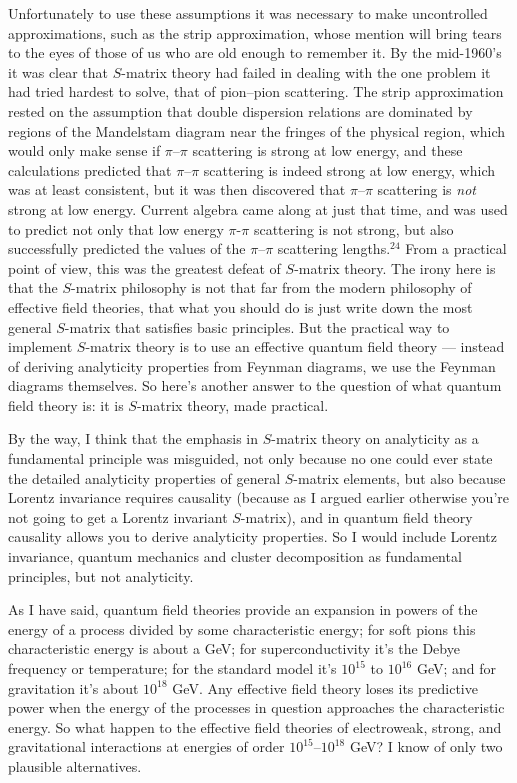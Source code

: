 \documentclass[12pt]{article}
\begin{document}
Unfortunately to use these assumptions it was necessary to
make uncontrolled approximations, such as the strip
approximation, whose mention will bring tears to the eyes of
those of us who are old enough to remember it.  By the
mid-1960's it was clear that $S$-matrix theory had failed in
dealing with the one problem it had tried hardest to solve,
that of pion--pion scattering.  The strip approximation
rested on the assumption that double dispersion relations
are dominated by regions of the Mandelstam diagram near the
fringes of the physical region, which  would only make sense
if $\pi$--$\pi$ scattering is strong at low energy, and
these calculations  predicted that $\pi$--$\pi$ scattering
is indeed strong at low energy, which was at least
consistent, but it was then discovered that $\pi$--$\pi$
scattering is {\em not} strong at low energy.  Current
algebra came along at just that time, and was used to
predict not only that low energy $\pi$-$\pi$ scattering is
not strong, but also successfully predicted the values of
the $\pi$--$\pi$ scattering lengths.$^{24}$ From a practical
point
of view, this was the greatest defeat of $S$-matrix theory.
The irony here is that the $S$-matrix philosophy is not that
far from the modern philosophy of effective field theories,
that what you should do is just write down the most general
$S$-matrix  that satisfies basic principles.  But the
practical way to implement $S$-matrix theory is to use an
effective quantum field theory --- instead of deriving
analyticity properties from Feynman diagrams, we use the
Feynman diagrams themselves.  So here's another answer to
the question of what quantum field theory is: it is
$S$-matrix theory, made practical.

By the way, I think that the emphasis in $S$-matrix theory
on analyticity as a fundamental principle was misguided, not
only because no one could ever state  the detailed
analyticity properties of general $S$-matrix elements, but
also because Lorentz invariance requires causality (because
as I argued earlier otherwise you're not going to get a
Lorentz invariant $S$-matrix), and in quantum field theory
causality allows you to derive analyticity properties.  So I
would include Lorentz invariance, quantum mechanics and
cluster decomposition as fundamental principles, but not
analyticity.

 As I have said, quantum field theories provide an expansion
in powers of the energy of a process divided by  some
characteristic energy; for soft pions this characteristic
energy is about a GeV; for superconductivity it's the Debye
frequency or temperature; for the standard model it's
$10^{15}$ to $10^{16}$ GeV; and for gravitation it's about
$10^{18}$ GeV.  Any effective field theory loses its
predictive power when the energy of the processes in
question approaches the characteristic energy.  So what
happen to the effective field  theories of electroweak,
strong, and gravitational interactions at  energies of order
$10^{15}$--$10^{18}$ GeV?  I know of only two plausible
alternatives.
\end{document}
